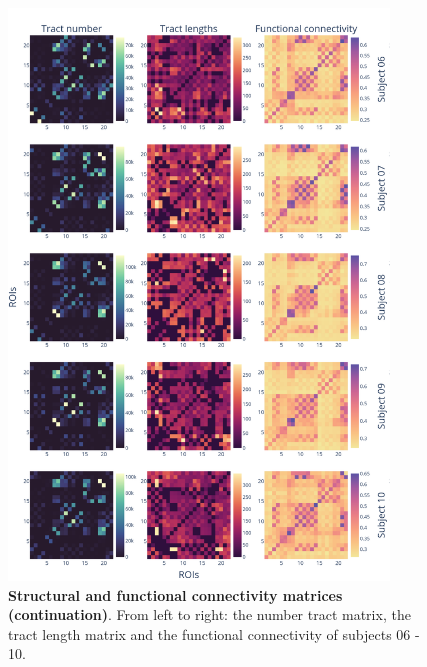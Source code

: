 \documentclass[../main.tex]{subfiles}
\begin{document}
\begin{figure}[htbp]
    \ContinuedFloat %
    \centering
    \includegraphics[width=0.9\textwidth]{chapter3/figures/empirical_matrices_1.png}
    \caption{\textbf{Structural and functional connectivity matrices (continuation)}.
    From left to right: the number tract matrix, the tract length matrix and the functional connectivity of subjects 06 - 10.}
\end{figure}
\end{document}
